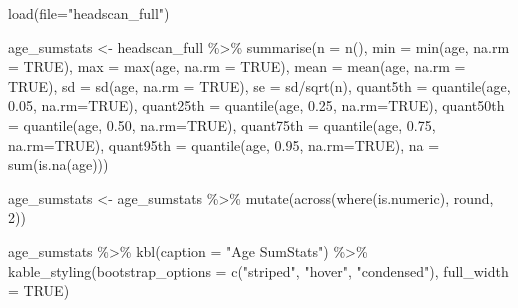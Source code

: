 \documentclass[
]{article}
\newenvironment{Shaded}{\begin{snugshade}}{\end{snugshade}}
\newcommand{\AttributeTok}[1]{\textcolor[rgb]{0.77,0.63,0.00}{#1}}
\newcommand{\ConstantTok}[1]{\textcolor[rgb]{0.00,0.00,0.00}{#1}}
\newcommand{\DecValTok}[1]{\textcolor[rgb]{0.00,0.00,0.81}{#1}}
\newcommand{\FloatTok}[1]{\textcolor[rgb]{0.00,0.00,0.81}{#1}}
\newcommand{\FunctionTok}[1]{\textcolor[rgb]{0.00,0.00,0.00}{#1}}
\newcommand{\NormalTok}[1]{#1}
\newcommand{\OtherTok}[1]{\textcolor[rgb]{0.56,0.35,0.01}{#1}}
\newcommand{\SpecialCharTok}[1]{\textcolor[rgb]{0.00,0.00,0.00}{#1}}
\newcommand{\StringTok}[1]{\textcolor[rgb]{0.31,0.60,0.02}{#1}}
\begin{document}
\begin{Shaded}
\begin{Highlighting}[]
\FunctionTok{load}\NormalTok{(}\AttributeTok{file=}\StringTok{"headscan\_full"}\NormalTok{)}
\end{Highlighting}
\end{Shaded}

\begin{Shaded}
\begin{Highlighting}[]
\NormalTok{age\_sumstats }\OtherTok{\textless{}{-}}\NormalTok{ headscan\_full }\SpecialCharTok{\%\textgreater{}\%} 
  \FunctionTok{summarise}\NormalTok{(}\AttributeTok{n =} \FunctionTok{n}\NormalTok{(),}
            \AttributeTok{min =} \FunctionTok{min}\NormalTok{(age, }\AttributeTok{na.rm =} \ConstantTok{TRUE}\NormalTok{),}
            \AttributeTok{max =} \FunctionTok{max}\NormalTok{(age, }\AttributeTok{na.rm =} \ConstantTok{TRUE}\NormalTok{),}
            \AttributeTok{mean =} \FunctionTok{mean}\NormalTok{(age, }\AttributeTok{na.rm =} \ConstantTok{TRUE}\NormalTok{),}
            \AttributeTok{sd =} \FunctionTok{sd}\NormalTok{(age, }\AttributeTok{na.rm =} \ConstantTok{TRUE}\NormalTok{),}
            \AttributeTok{se =}\NormalTok{ sd}\SpecialCharTok{/}\FunctionTok{sqrt}\NormalTok{(n),}
            \AttributeTok{quant5th =} \FunctionTok{quantile}\NormalTok{(age, }\FloatTok{0.05}\NormalTok{, }\AttributeTok{na.rm=}\ConstantTok{TRUE}\NormalTok{),}
            \AttributeTok{quant25th =} \FunctionTok{quantile}\NormalTok{(age, }\FloatTok{0.25}\NormalTok{, }\AttributeTok{na.rm=}\ConstantTok{TRUE}\NormalTok{),}
            \AttributeTok{quant50th =} \FunctionTok{quantile}\NormalTok{(age, }\FloatTok{0.50}\NormalTok{, }\AttributeTok{na.rm=}\ConstantTok{TRUE}\NormalTok{),}
            \AttributeTok{quant75th =} \FunctionTok{quantile}\NormalTok{(age, }\FloatTok{0.75}\NormalTok{, }\AttributeTok{na.rm=}\ConstantTok{TRUE}\NormalTok{),}
            \AttributeTok{quant95th =} \FunctionTok{quantile}\NormalTok{(age, }\FloatTok{0.95}\NormalTok{, }\AttributeTok{na.rm=}\ConstantTok{TRUE}\NormalTok{),}
            \AttributeTok{na =} \FunctionTok{sum}\NormalTok{(}\FunctionTok{is.na}\NormalTok{(age)))}

\NormalTok{age\_sumstats }\OtherTok{\textless{}{-}}\NormalTok{ age\_sumstats }\SpecialCharTok{\%\textgreater{}\%} 
  \FunctionTok{mutate}\NormalTok{(}\FunctionTok{across}\NormalTok{(}\FunctionTok{where}\NormalTok{(is.numeric), round, }\DecValTok{2}\NormalTok{))}
            
\NormalTok{age\_sumstats }\SpecialCharTok{\%\textgreater{}\%} 
  \FunctionTok{kbl}\NormalTok{(}\AttributeTok{caption =} \StringTok{"Age SumStats"}\NormalTok{) }\SpecialCharTok{\%\textgreater{}\%} 
  \FunctionTok{kable\_styling}\NormalTok{(}\AttributeTok{bootstrap\_options =} \FunctionTok{c}\NormalTok{(}\StringTok{"striped"}\NormalTok{, }\StringTok{"hover"}\NormalTok{, }\StringTok{"condensed"}\NormalTok{), }\AttributeTok{full\_width =} \ConstantTok{TRUE}\NormalTok{)}
\end{Highlighting}
\end{Shaded}
\end{document}
